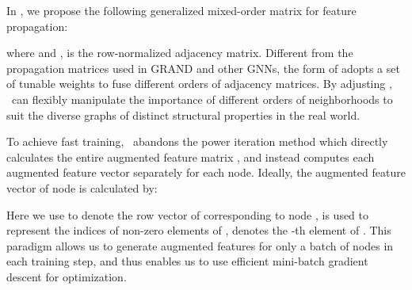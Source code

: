  In \model, we propose the following generalized mixed-order matrix for feature propagation:

where  and ,  is the row-normalized adjacency matrix.
Different from the propagation matrices used in GRAND and other GNNs, the form of  adopts a set of tunable weights  to fuse different orders of adjacency matrices. 
By adjusting , \model\ can {flexibly} manipulate the importance of different orders of neighborhoods to suit the diverse graphs of distinct structural properties in the real world. 

To achieve fast training, \model\ abandons the power iteration method which directly calculates the entire augmented feature matrix , and instead computes each augmented feature vector separately for each node. 
Ideally, the augmented feature vector  of node  is  calculated by:



Here we use  to denote the row vector of  corresponding to node ,  is used to represent the indices of non-zero elements of ,  denotes the -th element of . 
This paradigm allows us to generate augmented features for only a batch of nodes in each training step, and thus enables us to use efficient mini-batch gradient descent for optimization. 

